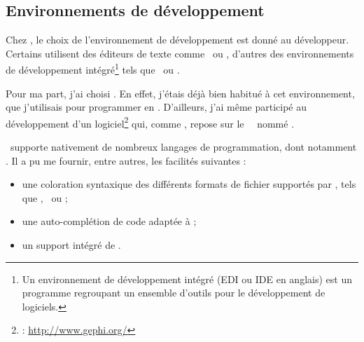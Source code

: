 \subsection{Environnements de développement}

Chez \asl, le choix de l'environnement de développement est donné au développeur. Certains utilisent des éditeurs de texte comme \aultraedit\ ou \avim, d'autres des environnements de développement intégré\footnote{Un environnement de développement intégré (EDI ou IDE en anglais) est un programme regroupant un ensemble d'outils pour le développement de logiciels.\cite{edi}} tels que \aeclipse\ ou \anetbeans.

Pour ma part, j'ai choisi \anetbeans. En effet, j'étais déjà bien habitué à cet environnement, que j'utilisais pour programmer en \ajava. D'ailleurs, j'ai même participé au développement d'un logiciel\footnote{\agephi : \url{http://www.gephi.org/}} qui, comme \anetbeans, repose sur le \afm\ \ajava\ nommé \anbp.

\anetbeans\ supporte nativement de nombreux langages de programmation, dont notamment \aphp. Il a pu me fournir, entre autres, les facilités suivantes :

\begin{itemize}
	\item une coloration syntaxique des différents formats de fichier supportés par \asf, tels que \aphp, \ahtml\ ou \ayml ;
	\item une auto-complétion de code adaptée à \asf ;
	\item un support intégré de \asvn.
\end{itemize}
